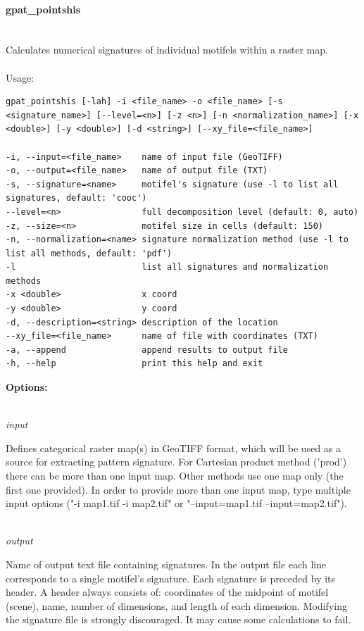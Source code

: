 \documentclass[12pt,margin=0.5in]{article}
\newcommand{\newparagraph}[1]{\paragraph{#1}\mbox{}\\}
\newcommand{\newoption}[1]{\mbox{}\\{\it #1}}
\begin{document}
\newparagraph{gpat\_pointshis}
Calculates numerical signatures of individual motifels within a raster map.
\\\\
Usage:

\begin{minipage}{\linewidth}
\begin{lstlisting}
gpat_pointshis [-lah] -i <file_name> -o <file_name> [-s <signature_name>] [--level=<n>] [-z <n>] [-n <normalization_name>] [-x <double>] [-y <double>] [-d <string>] [--xy_file=<file_name>]

-i, --input=<file_name>    name of input file (GeoTIFF)
-o, --output=<file_name>   name of output file (TXT)
-s, --signature=<name>     motifel's signature (use -l to list all signatures, default: 'cooc')
--level=<n>                full decomposition level (default: 0, auto)
-z, --size=<n>             motifel size in cells (default: 150)
-n, --normalization=<name> signature normalization method (use -l to list all methods, default: 'pdf')
-l                         list all signatures and normalization methods
-x <double>                x coord
-y <double>                y coord
-d, --description=<string> description of the location
--xy_file=<file_name>      name of file with coordinates (TXT)
-a, --append               append results to output file
-h, --help                 print this help and exit
\end{lstlisting}
\end{minipage}

{\bf Options:}

\newoption{input}

Defines categorical raster map(s) in GeoTIFF format, which will be used as a source for extracting pattern signature. For Cartesian product method ('prod') there can be more than one input map. Other methods use one map only (the first one provided). In order to provide more than one input map, type multiple input options ("-i map1.tif -i map2.tif" or "--input=map1.tif --input=map2.tif").

\newoption{output}

Name of output text file containing signatures. In the output file each line corresponds to a single motifel's signature. Each signature is preceded by its header. A header always consists of: coordinates of the midpoint of motifel (scene), name, number of dimensions, and length of each dimension. Modifying the signature file is strongly discouraged. It may cause some calculations to fail.
\end{document}
